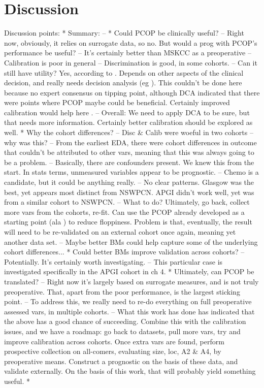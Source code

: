 \documentclass[dissertation.tex]{subfiles}
\begin{document}
\section{Discussion}


Discussion points:
  * Summary:
    -- 
  * Could PCOP be clinically useful?
    -- Right now, obviously, it relies on surrogate data, so no.  But would a prog with PCOP's performance be useful?
    -- It's certainly better than MSKCC as a preoperative
    -- Calibration is poor in general
    -- Discrimination is good, in some cohorts.
    -- Can it still have utility?  Yes, according to \cite{Steyerberg2010}.  Depends on other aspects of the clinical decision, and really needs decision analysis (eg \cite{Vickers2008}).  This couldn't be done here because no expert consensus on tipping point, although DCA indicated that there were points where PCOP maybe could be beneficial.  Certainly improved calibration would help here \cite{VanCalster2014}.
    -- Overall: We need to apply DCA to be sure, but that needs more information.  Certainly better calibration should be explored as well.
  * Why the cohort differences?
    -- Disc & Calib were woeful in two cohorts -- why was this?
    -- From the earliest EDA, there were cohort differences in outcome that couldn't be attributed to other vars, meaning that this was always going to be a problem.
    -- Basically, there are confounders present.  We knew this from the start.  In stats terms, unmeasured variables appear to be prognostic.
    -- Chemo is a candidate, but it could be anything really.
    -- No clear patterns.  Glasgow was the best, yet appears most distinct from NSWPCN.  APGI didn't work well, yet was from a similar cohort to NSWPCN.
    -- What to do?  Ultimately, go back, collect more vars from the cohorts, re-fit.  Can use the PCOP already developed as a starting point (ala \cite{VanHouwelingen2000}) to reduce floppiness.  Problem is that, eventually, the result will need to be re-validated on an external cohort once again, meaning yet another data set.
    -- Maybe better BMs could help capture some of the underlying cohort differences...
  * Could better BMs improve validation across cohorts?
    -- Potentially.  It's certainly worth investigating.
    -- This particular case is investigated specifically in the APGI cohort in ch 4.
  * Ultimately, can PCOP be translated?
    -- Right now it's largely based on surrogate measures, and is not truly preoperative.  That, apart from the poor performance, is the largest sticking point.
    -- To address this, we really need to re-do everything on full preoperative assessed vars, in multiple cohorts.
    -- What this work has done has indicated that the above has a good chance of succeeding.  Combine this with the calibration issues, and we have a roadmap: go back to datasets, pull more vars, try and improve calibration across cohorts.  Once extra vars are found, perform prospective collection on all-comers, evaluating size, loc, A2 & A4, by preoperative means.  Construct a prognostic on the basis of these data, and validate externally.  On the basis of this work, that will probably yield something useful.
  * 
\end{document}
